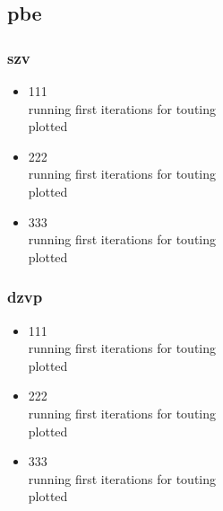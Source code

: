 \documentclass[12pt]{article}
\begin{document}
\subsection{pbe}
\subsubsection{szv}
\begin{itemize}
\item 111\\running first iterations for touting\\plotted
\item 222\\running first iterations for touting\\plotted
\item 333\\running first iterations for touting\\plotted
\end{itemize}
\subsubsection{dzvp}
\begin{itemize}
\item 111\\running first iterations for touting\\plotted
\item 222\\running first iterations for touting\\plotted
\item 333\\running first iterations for touting\\plotted
\end{itemize}
\end{document}
